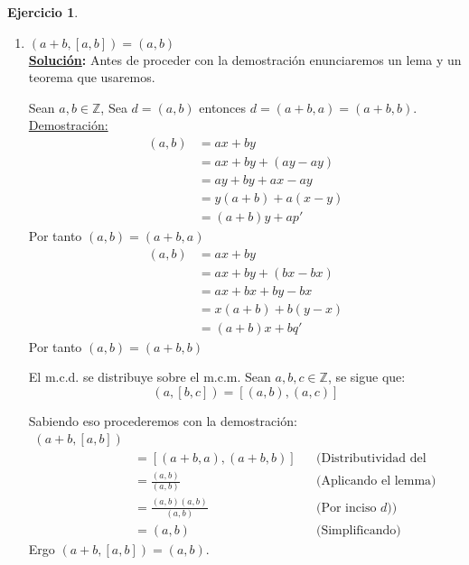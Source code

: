 \documentclass[11pt,letterpaper]{article}
\theoremstyle{definition}\newtheorem{p}{Ejercicio}
\theoremstyle{definition}\newtheorem{pp}[p]{$(*)$Ejercicio}
\numberwithin{p}{section}
\newcommand{\Z}{\mathbb{Z}}
\newcommand{\sol}{\textbf{\underline{Solución}: }} %
\begin{document}
\begin{p}
\begin{enumerate}
  \item $(a+b,[a,b])=(a,b)$\\
  \sol Antes de proceder con la demostración enunciaremos un lema y un teorema que usaremos.
  \begin{lemma}
  Sean $a,b \in \Z$, Sea $d = (a,b)$ entonces $d = (a+b,a) = (a+b,b)$.\\
  \underline{Demostración:} 
  \begin{align*}
  (a,b) &= ax + by\\
    &= ax + by + (ay - ay)\\
    &= ay + by + ax - ay\\
    &= y(a+b) + a(x-y)\\
    &= (a+b)y + ap'
  \end{align*}
  Por tanto $(a,b) = (a+b,a)$
  \begin{align*}
  (a,b)
    &= ax + by\\
    &= ax + by + (bx - bx)\\
    &= ax + bx + by - bx\\
    &= x(a+b) + b(y-x)\\
    &= (a+b)x + bq'
  \end{align*}
  Por tanto $(a,b) = (a+b,b)$
  \end{lemma}

  \begin{theorem}
  El m.c.d. se distribuye sobre el m.c.m. Sean $a,b,c \in \Z$, se sigue que:
  $$(a,[b,c]) = [(a,b),(a,c)]$$
  \end{theorem}
  
  Sabiendo eso procederemos con la demostración:
  \begin{align*}
  (a+b, [a,b]) \\
    &= [(a+b,a), (a+b, b)] && \text{(Distributividad del m.c.d. sobre m.c.m)}\\
    &= \frac{(a,b)}{(a,b)} && \text{(Aplicando el lemma)}\\
    &= \frac{(a,b)(a,b)}{(a,b)} && \text{(Por inciso $d)$)}\\
    &= (a, b) && \text{(Simplificando)}
  \end{align*}
  Ergo $(a+b,[a,b])=(a,b)$.
  
  \end{enumerate}
\end{p}
%
\end{document}
